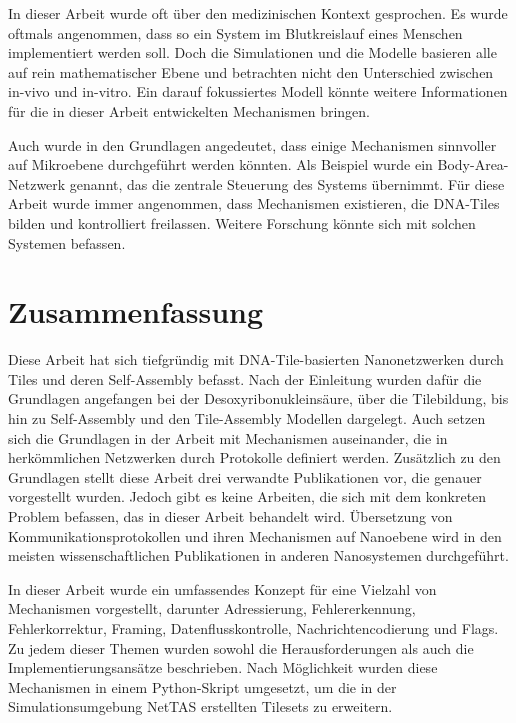 In dieser Arbeit wurde oft über den medizinischen Kontext gesprochen. Es wurde oftmals angenommen, dass so ein System im Blutkreislauf eines Menschen implementiert werden soll. Doch die Simulationen und die Modelle basieren alle auf rein mathematischer Ebene und betrachten nicht den Unterschied zwischen in-vivo und in-vitro. Ein darauf fokussiertes Modell könnte weitere Informationen für die in dieser Arbeit entwickelten Mechanismen bringen. 

Auch wurde in den Grundlagen angedeutet, dass einige Mechanismen sinnvoller auf Mikroebene durchgeführt werden könnten. Als Beispiel wurde ein Body-Area-Netzwerk genannt, das die zentrale Steuerung des Systems übernimmt. Für diese Arbeit wurde immer angenommen, dass Mechanismen existieren, die DNA-Tiles bilden und kontrolliert freilassen. Weitere Forschung könnte sich mit solchen Systemen befassen. 

\section{Zusammenfassung}
Diese Arbeit hat sich tiefgründig mit DNA-Tile-basierten Nanonetzwerken durch Tiles und deren Self-Assembly befasst. Nach der Einleitung wurden dafür die Grundlagen angefangen bei der Desoxyribonukleinsäure, über die Tilebildung, bis hin zu Self-Assembly und den Tile-Assembly Modellen dargelegt. Auch setzen sich die Grundlagen in der Arbeit mit Mechanismen auseinander, die in herkömmlichen Netzwerken durch Protokolle definiert werden. Zusätzlich zu den Grundlagen stellt diese Arbeit drei verwandte Publikationen vor, die genauer vorgestellt wurden. Jedoch gibt es keine Arbeiten, die sich mit dem konkreten Problem befassen, das in dieser Arbeit behandelt wird. Übersetzung von Kommunikationsprotokollen und ihren Mechanismen auf Nanoebene wird in den meisten wissenschaftlichen Publikationen in anderen Nanosystemen durchgeführt.

In dieser Arbeit wurde ein umfassendes Konzept für eine Vielzahl von Mechanismen vorgestellt, darunter Adressierung, Fehlererkennung, Fehlerkorrektur, Framing, Datenflusskontrolle, Nachrichtencodierung und Flags. Zu jedem dieser Themen wurden sowohl die Herausforderungen als auch die Implementierungsansätze beschrieben. Nach Möglichkeit wurden diese Mechanismen in einem Python-Skript umgesetzt, um die in der Simulationsumgebung NetTAS erstellten Tilesets zu erweitern.

